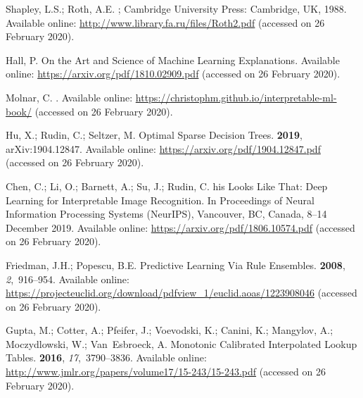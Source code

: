 \documentclass[information,article,accept,moreauthors,pdftex]{Definitions/mdpi}
\begin{document}
\begin{thebibliography}{999}
Shapley, L.S.; Roth, A.E.
; Cambridge University Press: Cambridge, UK, 1988. 
\newblock Available online: \url{http://www.library.fa.ru/files/Roth2.pdf} (accessed on 26 February 2020).

Hall, P.
\newblock On the {A}rt and {S}cience of {M}achine {L}earning {E}xplanations.
\newblock Available online: \url{https://arxiv.org/pdf/1810.02909.pdf} (accessed on 26 February 2020).

Molnar, C.
.
\newblock Available online: \url{https://christophm.github.io/interpretable-ml-book/} (accessed on 26 February 2020).

Hu, X.; Rudin, C.; Seltzer, M.
\newblock Optimal {S}parse {D}ecision {T}rees.
 {\bf 2019}, arXiv:1904.12847.
\newblock Available online: \url{https://arxiv.org/pdf/1904.12847.pdf} (accessed on 26 February 2020).

Chen, C.; Li, O.; Barnett, A.; Su, J.; Rudin, C.
his {L}ooks {L}ike {T}hat: {D}eep {L}earning for {I}nterpretable
  {I}mage {R}ecognition.
\newblock  In Proceedings of Neural Information Processing Systems {(NeurIPS)}, Vancouver, BC, Canada, 8--14 December 2019. 
\newblock Available online: \url{https://arxiv.org/pdf/1806.10574.pdf} (accessed on 26 February 2020).

Friedman, J.H.; Popescu, B.E.
\newblock Predictive {L}earning {V}ia {R}ule {E}nsembles.
 {\bf 2008}, {\em 2},~916--954.
\newblock Available online: 
  \url{https://projecteuclid.org/download/pdfview_1/euclid.aoas/1223908046} (accessed on 26 February 2020).

Gupta, M.; Cotter, A.; Pfeifer, J.; Voevodski, K.; Canini, K.; Mangylov, A.;
  Moczydlowski, W.; Van~Esbroeck, A.
\newblock Monotonic {C}alibrated {I}nterpolated {L}ookup {T}ables.
 {\bf 2016}, {\em
  17},~3790--3836.
\newblock Available online: \url{http://www.jmlr.org/papers/volume17/15-243/15-243.pdf} (accessed on 26 February 2020).


\end{thebibliography}
\end{document}

